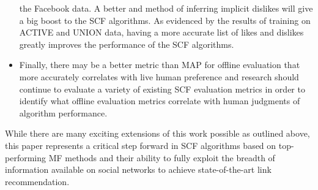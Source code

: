 \begin{itemize}
the Facebook data.  A better and method of inferring implicit dislikes
will give a big boost to the SCF algorithms. As evidenced by the
results of training on ACTIVE and UNION data, having a more accurate
list of likes and dislikes greatly improves the performance of the SCF
algorithms.
\item Finally, there may be a better metric than MAP for offline
evaluation that more accurately correlates with live human
preference and research should continue to evaluate a variety
of existing SCF evaluation metrics in order to identify what
offline evaluation metrics correlate with human judgments of
algorithm performance.
\end{itemize}

While there are many exciting extensions of this work possible
as outlined above, 
this paper represents a critical step forward in SCF
algorithms based on top-performing MF methods and their ability to
fully exploit the breadth of information available on social networks
to achieve state-of-the-art link recommendation.

